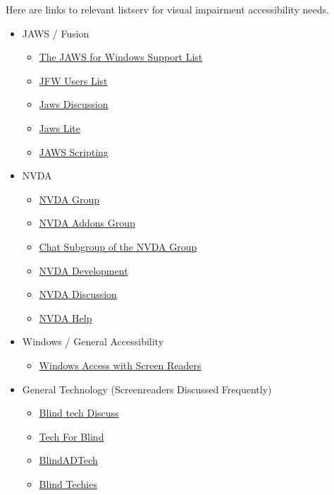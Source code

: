 Here are links to relevant listserv for visual impairment accessibility needs.
\begin{itemize}[leftmargin=*]
	\item JAWS / Fusion
	      \begin{itemize}[leftmargin=2em]
	      	\item \href{http://www.groups.io/g/jfw/}{The JAWS for Windows Support List}
	      	\item \href{http://groups.io/g/jfw-users/}{JFW Users List}
	      	\item \href{http://groups.io/g/jawsdiscussion/}{Jaws Discussion}
	      	\item \href{http://groups.io/g/jawslite/}{Jaws Lite}  
	      	\item \href{http://groups.io/g/jawsscripting/}{JAWS Scripting}  
	      \end{itemize}
	\item NVDA
	      \begin{itemize}[leftmargin=2em]
	      	\item \href{http://nvda.groups.io/g/nvda/ }{NVDA Group}  
	      	\item \href{http://nvda-addons.groups.io/g/nvda-addons}{NVDA Addons Group}  
	      	\item \href{http://nvda.groups.io/g/chat/ }{Chat Subgroup of the NVDA Group}  
	      	\item \href{http://groups.io/g/nvda-devel/messages}{NVDA Development}  
	      	\item \href{http://groups.io/g/nvdadiscussion/messages}{NVDA Discussion}  
	      	\item \href{http://groups.io/g/NVDAhelp/messages}{NVDA Help}  
	      \end{itemize}
	\item Windows / General Accessibility
	      \begin{itemize}[leftmargin=2em]
	      	\item \href{http://winaccess.groups.io/g/winaccess}{Windows Access with Screen Readers}  
	      \end{itemize}
	\item General Technology (Screenreaders Discussed Frequently)
	      \begin{itemize}[leftmargin=2em]
	      	\item \href{http://groups.io/g/blindtechdiscuss/messages}{Blind tech Discuss}  
	      	\item \href{http://groups.io/g/tech-for-blind}{Tech For Blind}  
	      	\item \href{http://groups.io/g/blindadtech}{BlindADTech}  
	      	\item \href{http://groups.io/g/blind-techies/messages}{Blind Techies}  
	      \end{itemize}
\end{itemize}